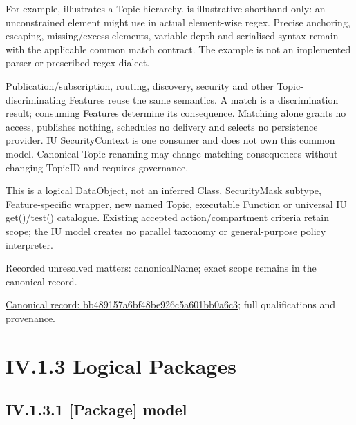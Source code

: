 For example, \texttt{}
illustrates a Topic hierarchy. \texttt{}
is illustrative shorthand only: an unconstrained element might use \texttt{} in actual
element-wise regex. Precise anchoring, escaping, missing/excess elements, variable
depth and serialised syntax remain with the applicable common match contract.
The example is not an implemented parser or prescribed regex dialect.



Publication/subscription, routing, discovery, security and other Topic-discriminating
Features reuse the same semantics. A match is a discrimination result; consuming
Features determine its consequence. Matching alone grants no access, publishes
nothing, schedules no delivery and selects no persistence provider. IU SecurityContext
is one consumer and does not own this common model. Canonical Topic renaming may
change matching consequences without changing TopicID and requires governance.



This is a logical DataObject, not an inferred Class, SecurityMask subtype,
Feature-specific wrapper, new named Topic, executable Function or universal IU
get()/test() catalogue. Existing accepted action/compartment criteria retain scope;
the IU model creates no parallel taxonomy or general-purpose policy interpreter.


{\small Recorded unresolved matters: canonicalName; exact scope remains in the canonical record.}\par
{\footnotesize \href{../../../../../../../../continuum/application/data-object/bb489157a6bf48be926c5a601bb0a6c3.md}{Canonical record: bb489157a6bf48be926c5a601bb0a6c3}; full qualifications and provenance.}\par
\section*{IV.1.3 Logical Packages}
\label{navigation:IV.1.3}

\subsection*{IV.1.3.1 [Package] model}
\label{navigation:IV.1.3.1}

